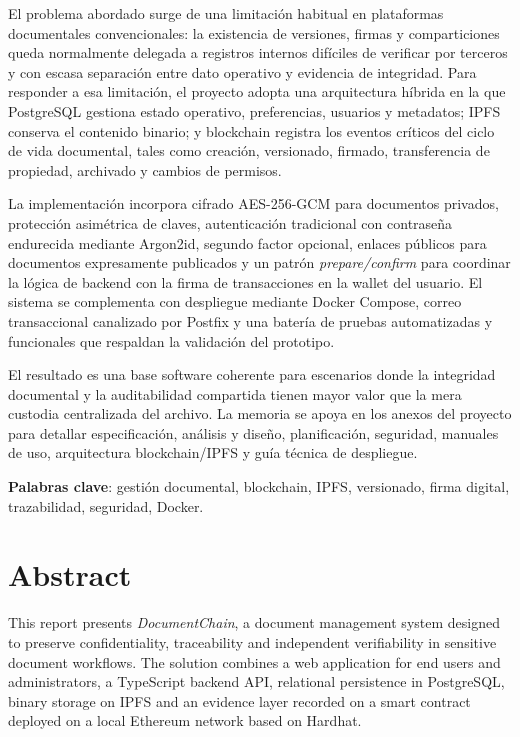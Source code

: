 \documentclass[11pt, a4paper]{article}
\begin{document}
El problema abordado surge de una limitación habitual en plataformas documentales convencionales: la existencia de versiones, firmas y comparticiones queda normalmente delegada a registros internos difíciles de verificar por terceros y con escasa separación entre dato operativo y evidencia de integridad. Para responder a esa limitación, el proyecto adopta una arquitectura híbrida en la que PostgreSQL gestiona estado operativo, preferencias, usuarios y metadatos; IPFS conserva el contenido binario; y blockchain registra los eventos críticos del ciclo de vida documental, tales como creación, versionado, firmado, transferencia de propiedad, archivado y cambios de permisos.

La implementación incorpora cifrado AES-256-GCM para documentos privados, protección asimétrica de claves, autenticación tradicional con contraseña endurecida mediante Argon2id, segundo factor opcional, enlaces públicos para documentos expresamente publicados y un patrón \textit{prepare/confirm} para coordinar la lógica de backend con la firma de transacciones en la wallet del usuario. El sistema se complementa con despliegue mediante Docker Compose, correo transaccional canalizado por Postfix y una batería de pruebas automatizadas y funcionales que respaldan la validación del prototipo.

El resultado es una base software coherente para escenarios donde la integridad documental y la auditabilidad compartida tienen mayor valor que la mera custodia centralizada del archivo. La memoria se apoya en los anexos del proyecto para detallar especificación, análisis y diseño, planificación, seguridad, manuales de uso, arquitectura blockchain/IPFS y guía técnica de despliegue.

\textbf{Palabras clave}: gestión documental, blockchain, IPFS, versionado, firma digital, trazabilidad, seguridad, Docker.

\section*{Abstract}

This report presents \textit{DocumentChain}, a document management system designed to preserve confidentiality, traceability and independent verifiability in sensitive document workflows. The solution combines a web application for end users and administrators, a TypeScript backend API, relational persistence in PostgreSQL, binary storage on IPFS and an evidence layer recorded on a smart contract deployed on a local Ethereum network based on Hardhat.
\end{document}
